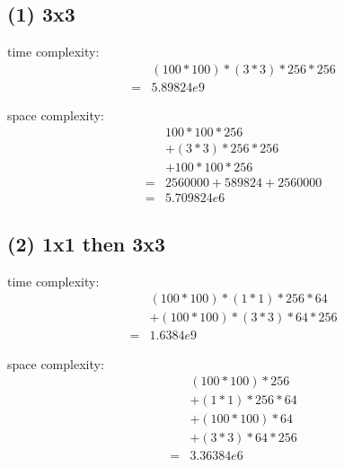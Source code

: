 \documentclass{subfiles}
\begin{document}
\subsection*{(1) 3x3}

time complexity:
\begin{align*}
& (100 * 100) * (3 * 3) * 256 * 256 \\
= & 5.89824e9
\end{align*}

space complexity:
\begin{align*}
& 100 * 100 * 256 \\
& + (3 * 3) * 256 * 256 \\
& + 100 * 100 * 256 \\
= & 2560000 + 589824 + 2560000 \\
= & 5.709824e6
\end{align*}

\subsection*{(2) 1x1 then 3x3}

time complexity:
\begin{align*}
& (100 * 100) * (1 * 1) * 256 * 64 \\
& + (100 * 100) * (3 * 3) * 64 * 256 \\
= & 1.6384e9
\end{align*}

space complexity:
\begin{align*}
& (100 * 100) * 256 \\
& + (1 * 1) * 256 * 64 \\
& + (100 * 100) * 64 \\
& + (3 * 3) * 64 * 256 \\
= & 3.36384e6
\end{align*}
\end{document}
